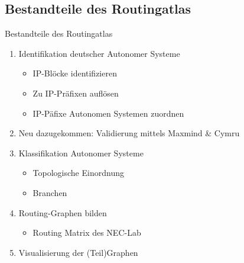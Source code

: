 \documentclass[ngerman,compress,hyperref={bookmarks}]{beamer}
\begin{document}
\subsection{Bestandteile des Routingatlas}
\begin{frame}[allowframebreaks]{Bestandteile des Routingatlas}
  \begin{enumerate}
  \item Identifikation deutscher Autonomer Systeme
  \begin {itemize}
    \item IP-Blöcke identifizieren
    \item Zu IP-Präfixen auflösen
    \item IP-Päfixe Autonomen Systemen zuordnen
  \end{itemize}
  \item Neu dazugekommen: Validierung mittels Maxmind \& Cymru
  \item Klassifikation Autonomer Systeme
  \begin{itemize}
    \item Topologische Einordnung
    \item Branchen
  \end{itemize}
  \item Routing-Graphen bilden
  \begin{itemize}
    \item Routing Matrix des NEC-Lab
  \end{itemize}
  \framebreak
  \item Visualisierung der (Teil)Graphen
  \end{enumerate}


\end{frame}
\end{document}
